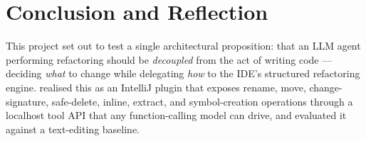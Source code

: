 %
\chapter{Conclusion and Reflection}
\label{ch:conclusion}

This project set out to test a single architectural proposition: that an LLM
agent performing refactoring should be \emph{decoupled} from the act of writing
code --- deciding \emph{what} to change while delegating \emph{how} to the IDE's
structured refactoring engine.  realised this as an
IntelliJ plugin that exposes rename, move, change-signature, safe-delete, inline,
extract, and symbol-creation operations through a localhost tool API that any
function-calling model can drive, and  evaluated it against a
text-editing baseline.

